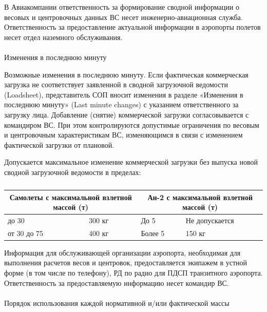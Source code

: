 В Авиакомпании ответственность за формирование сводной информации о весовых и центровочных данных ВС несет инженерно-авиационная служба. Ответственность за предоставление актуальной информации в аэропорты полетов несет отдел наземного обслуживания.

\paragraph{} Изменения в последнюю минуту

Возможные изменения в последнюю минуту. Если фактическая коммерческая загрузка не соответствует заявленной в сводной загрузочной ведомости (Loadsheet), представитель СОП вносит изменения в разделе «Изменения в последнюю минуту» (Last minute changes) с указанием ответственного за загрузку лица. Добавление (снятие) коммерческой загрузки согласовывается с командиром ВС. При этом контролируются допустимые ограничения по весовым и центровочным характеристикам ВС, изменяющимся в связи с изменением фактической загрузки от плановой.

Допускается максимальное изменение коммерческой загрузки без выпуска новой сводной загрузочной ведомости в пределах:

\begin{table}[H]
    \begin{center}
    \caption{} \label{tbl:10T1}
    \small                                                                                                                        \begin{tabular}{|p{}|p{}|p{}|p{}|}
    \hline
    \multicolumn{2}{|c|}{Самолеты с максимальной взлетной массой (т)}&\multicolumn{2}{c|}{Ан-2 с максимальной взлетной массой (т)}\\
    \hline
    до 30	    &300 кг	&До 5	    &Не допускается\\
    от 30 до 75	&400 кг	&Более 5	&150 кг\\
    \hline\hline
    \end{tabular}
\end{center}
\end{table}


Информация для обслуживающей организации аэропорта, необходимая для выполнения расчетов весов и центровок, предоставляется экипажем в устной форме (в том числе по телефону), РД по радио для ПДСП транзитного аэропорта. Ответственность за предоставляемую информацию несет командир ВС. 

\paragraph{} Порядок использования каждой нормативной и/или фактической массы

